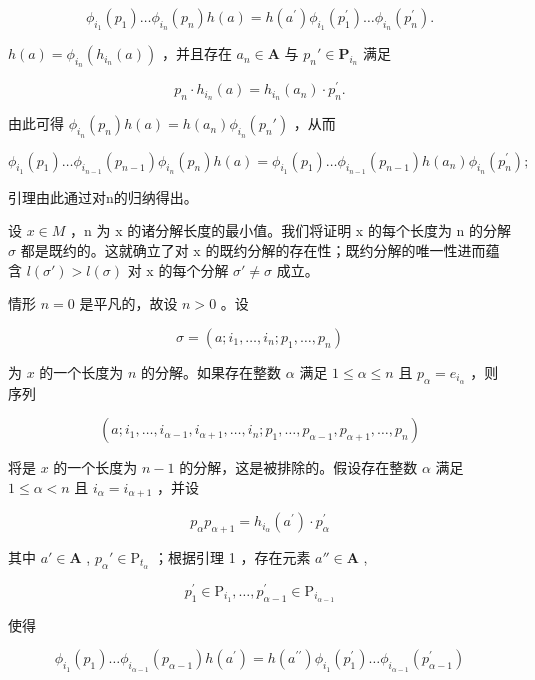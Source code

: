 \[
\phi_ {i _ {1}} (p _ {1}) \dots \phi_ {i _ {n}} (p _ {n}) h (a) = h (a ^ {\prime}) \phi_ {i _ {1}} (p _ {1} ^ {\prime}) \dots \phi_ {i _ {n}} (p _ {n} ^ {\prime}).
\]

\(h(a) = \phi_{i_n}(h_{i_n}(a))\) ，并且存在 \(a_{n} \in \mathbf{A}\) 与 \(p_n' \in \mathbf{P}_{i_n}\) 满足

\[
p _ {n} \cdot h _ {i _ {n}} (a) = h _ {i _ {n}} (a _ {n}) \cdot p _ {n} ^ {\prime}.
\]

由此可得 \(\phi_{i_n}(p_n)h(a) = h(a_n)\phi_{i_n}(p_n')\) ，从而

\[
\phi_ {i _ {1}} (p _ {1}) \dots \phi_ {i _ {n - 1}} (p _ {n - 1}) \phi_ {i _ {n}} (p _ {n}) h (a) = \phi_ {i _ {1}} (p _ {1}) \dots \phi_ {i _ {n - 1}} (p _ {n - 1}) h (a _ {n}) \phi_ {i _ {n}} (p _ {n} ^ {\prime});
\]

引理由此通过对n的归纳得出。


设 \(x \in M\) ，n 为 x 的诸分解长度的最小值。我们将证明 x 的每个长度为 n 的分解 \(\sigma\) 都是既约的。这就确立了对 x 的既约分解的存在性；既约分解的唯一性进而蕴含 \(l(\sigma') > l(\sigma)\) 对 x 的每个分解 \(\sigma' \neq \sigma\) 成立。

情形 \(n = 0\) 是平凡的，故设 \(n > 0\) 。设

\[
\sigma = (a; i _ {1}, \dots , i _ {n}; p _ {1}, \dots , p _ {n})
\]

为 \(x\) 的一个长度为 \(n\) 的分解。如果存在整数 \(\alpha\) 满足 \(1 \leqslant \alpha \leqslant n\) 且 \(p_{\alpha} = e_{i_{\alpha}}\) ，则序列

\[
(a; i _ {1}, \dots , i _ {\alpha - 1}, i _ {\alpha + 1}, \dots , i _ {n}; p _ {1}, \dots , p _ {\alpha - 1}, p _ {\alpha + 1}, \dots , p _ {n})
\]

将是 \(x\) 的一个长度为 \(n - 1\) 的分解，这是被排除的。假设存在整数 \(\alpha\) 满足 \(1 \leqslant \alpha < n\) 且 \(i_{\alpha} = i_{\alpha + 1}\) ，并设

\[
p _ {\alpha} p _ {\alpha + 1} = h _ {i _ {\alpha}} \left(a ^ {\prime}\right) \cdot p _ {\alpha} ^ {\prime}
\]

其中 \(a' \in \mathbf{A}\) , \(p_{\alpha}' \in \mathrm{P}_{t_{\alpha}}\) ；根据引理 1 ，存在元素 \(a'' \in \mathbf{A}\) ,

\[
p _ {1} ^ {\prime} \in \mathrm{P} _ {i _ {1}}, \dots , p _ {\alpha - 1} ^ {\prime} \in \mathrm{P} _ {i _ {\alpha - 1}}
\]

使得

\[
\phi_ {i _ {1}} (p _ {1}) \dots \phi_ {i _ {\alpha - 1}} (p _ {\alpha - 1}) h (a ^ {\prime}) = h (a ^ {\prime \prime}) \phi_ {i _ {1}} (p _ {1} ^ {\prime}) \dots \phi_ {i _ {\alpha - 1}} (p _ {\alpha - 1} ^ {\prime})
\]

